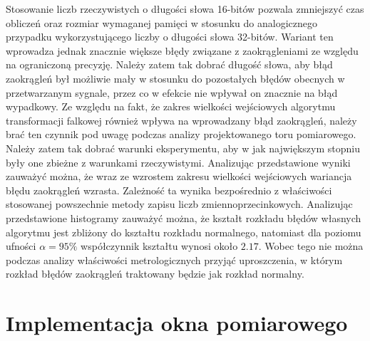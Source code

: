 Stosowanie liczb rzeczywistych o długości słowa 16-bitów pozwala zmniejszyć czas obliczeń oraz rozmiar wymaganej pamięci w stosunku do analogicznego przypadku wykorzystującego liczby o długości słowa 32-bitów. Wariant ten wprowadza jednak znacznie większe błędy związane z zaokrągleniami ze względu na ograniczoną precyzję. Należy zatem tak dobrać długość słowa, aby błąd zaokrągleń był możliwie mały w stosunku do pozostałych błędów obecnych w przetwarzanym sygnale, przez co w efekcie nie wpływał on znacznie na błąd wypadkowy. Ze względu na fakt, że zakres wielkości wejściowych algorytmu transformacji falkowej również wpływa na wprowadzany błąd zaokrągleń, należy brać ten czynnik pod uwagę podczas analizy projektowanego toru pomiarowego. Należy zatem tak dobrać warunki eksperymentu, aby w jak największym stopniu były one zbieżne z warunkami rzeczywistymi. Analizując przedstawione wyniki zauważyć można, że wraz ze wzrostem zakresu wielkości wejściowych wariancja błędu zaokrągleń wzrasta. Zależność ta wynika bezpośrednio z właściwości stosowanej powszechnie metody zapisu liczb zmiennoprzecinkowych. Analizując przedstawione histogramy zauważyć można, że kształt rozkładu błędów własnych algorytmu jest zbliżony do kształtu rozkładu normalnego, natomiast dla poziomu ufności $\alpha = 95\%$ współczynnik kształtu wynosi około $2.17$. Wobec tego nie można podczas analizy właściwości metrologicznych przyjąć uproszczenia, w którym rozkład błędów zaokrągleń traktowany będzie jak rozkład normalny.

\section{Implementacja okna pomiarowego}

